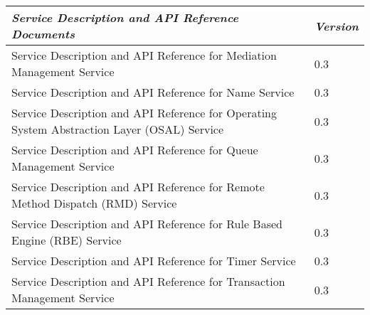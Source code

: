 \begin{tabular}{|p{4in}|p{1in}|} \hline
\textbf{\textit{Service Description and API Reference Documents}} &\textbf{\textit{Version}}\\\hline
Service Description and API Reference for Mediation Management Service &0.3\\
Service Description and API Reference for Name Service &0.3\\
Service Description and API Reference for Operating System Abstraction Layer (OSAL) Service &0.3\\
Service Description and API Reference for Queue Management Service &0.3\\
Service Description and API Reference for Remote Method Dispatch (RMD) Service &0.3\\
Service Description and API Reference for Rule Based Engine (RBE) Service &0.3\\
Service Description and API Reference for Timer Service &0.3\\
Service Description and API Reference for Transaction Management Service &0.3\\\hline
\end{tabular}

